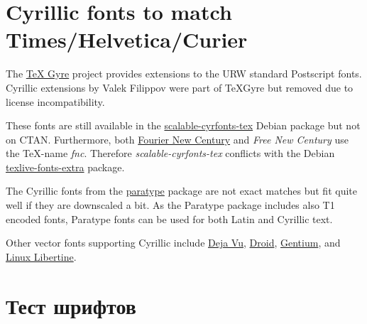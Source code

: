 \documentclass[a4paper]{article}
\begin{document}
\section*{Cyrillic fonts to match Times/Helvetica/Curier}

The \href{http://www.ctan.org/pkg/tex-gyre}{TeX Gyre} project provides
extensions to the URW standard Postscript fonts. Cyrillic extensions by
Valek Filippov were part of TeXGyre but removed due to license
incompatibility. 

These fonts are still available in the 
\href{http://packages.debian.org/stable/scalable-cyrfonts-tex}%
{scalable-cyrfonts-tex} Debian package but not on CTAN.  Furthermore, both
\href{http://www.ctan.org/pkg/fouriernc}{Fourier New Century} and
\emph{Free New Century} use the TeX-name \emph{fnc}. Therefore
\emph{scalable-cyrfonts-tex} conflicts with the Debian
\href{http://packages.debian.org/stable/texlive-fonts-extra}%
{texlive-fonts-extra} package.

The Cyrillic fonts from the
\href{http://www.ctan.org/pkg/paratype}{paratype} package are not exact
matches but fit quite well if they are downscaled a bit. As the Paratype
package includes also T1 encoded fonts, Paratype fonts can be used for both
Latin and Cyrillic text.

Other vector fonts supporting Cyrillic include
\href{http://www.ctan.org/pkg/dejavu}{Deja Vu},
\href{http://www.ctan.org/pkg/droid}{Droid},
\href{http://www.ctan.org/pkg/gentium-tug}{Gentium}, and
\href{http://www.ctan.org/pkg/libertine}{Linux Libertine}.

\section*{Тест шрифтов}

\newcommand{\teststring}{Hello world! 
	    \foreignlanguage{russian}{Здравствуй, мир!}}
\end{document}

